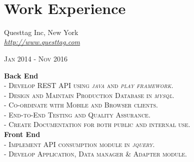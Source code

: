 \documentclass[10pt]{article} %
\begin{document}
\color{text1} %


\par{\\ %



\begin{minipage}[t]{0.5\textwidth} %
\vspace{0pt} %
	

\section{Work Experience} 

{{\raggedright\large Questtag Inc, New York  \\
\textit{\href {http://www.questtag.com}{http://www.questtag.com}}\\
}\raggedleft\textsc{Jan 2014 - Nov 2016}\\[1pt]}
\textbf{Back End}\\
	 \textsc{- Develop REST API using \textit{java} and \textit{play framework}.}\\
	 \textsc{- Design and Maintain Production Database in \textit{mysql}.}\\
	 \textsc{- Co-ordinate with Mobile and Browser clients.}\\
	 \textsc{- End-to-End Testing and Quality Assurance.}\\
	 \textsc{- Create Documentation for both public and internal use.}\\
\textbf{Front End}\\	
	 \textsc{- Implement API consumption module in \textit{jquery}.}\\
	 \textsc{- Develop Application, Data manager \& Adapter module.}\\




\end{minipage}}
\end{document}
